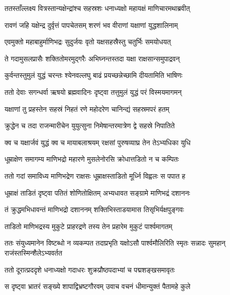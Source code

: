 
\twolineshloka
{ततस्ताँल्लक्ष्य वित्रस्तान्यक्षेन्द्रांश्च सहस्रशः}
{धनाध्यक्षो महायक्षं माणिचारमथाब्रवीत्} %

\twolineshloka
{रावणं जहि यक्षेन्द्र दुर्वृत्तं पापचेतसम्}
{शरणं भव वीराणां यक्षाणां युद्धशालिनाम्} %

\twolineshloka
{एवमुक्तो महाबाहुर्माणिभद्रः सुदुर्जयः}
{वृतो यक्षसहस्रैस्तु चतुर्भिः समयोधयत्} %

\twolineshloka
{ते गदामुसलप्रासैः शक्तितोमरमुद्गरैः}
{अभिघ्नन्तस्तदा यक्षा राक्षसान्समुपाद्रवन्} %

\twolineshloka
{कुर्वन्तस्तुमुलं युद्धं चरन्तः श्येनवल्लघु}
{बाढं प्रयच्छन्नेच्छामि दीयतामिति भाषिणः} %

\twolineshloka
{ततो देवाः सगन्धर्वा ऋषयो ब्रह्मवादिनः}
{दृष्ट्वा तत्तुमुलं युद्धं परं विस्मयमागमन्} %

\twolineshloka
{यक्षाणां तु प्रहस्तेन सहस्रं निहतं रणे}
{महोदरेण चानिन्द्यं सहस्रमपरं हतम्} %

\twolineshloka
{क्रुद्धेन च तदा राजन्मारीचेन युयुत्सुना}
{निमेषान्तरमात्रेण द्वे सहस्रे निपातिते} %

\twolineshloka
{क्व च यक्षार्जवं युद्धं क्व च मायाबलाश्रयम्}
{रक्षसां पुरुषव्याघ्र तेन तेऽभ्यधिका युधि} %

\twolineshloka
{धूम्राक्षेण समागम्य माणिभद्रो महारणे}
{मुसलेनोरसि क्रोधात्तडितो न च कम्पितः} %

\twolineshloka
{ततो गदां समाविध्य माणिभद्रेण राक्षसः}
{धूम्राक्षस्ताडितो मूर्ध्नि विह्वलः स पपात ह} %

\twolineshloka
{धूम्राक्षं ताडितं दृष्ट्वा पतितं शोणितोक्षितम्}
{अभ्यधावत सङ्ग्रामे माणिभद्रं दशाननः} %

\twolineshloka
{तं क्रुद्धमभिधावन्तं माणिभद्रो दशाननम्}
{शक्तिभिस्ताडयामास तिसृभिर्यक्षपुङ्गवः} %

\twolineshloka
{ताडितो माणिभद्रस्य मुकुटे प्राहरद्रणे}
{तस्य तेन प्रहारेम मुकुटं पार्श्वमागतम्} %

\threelineshloka
{ततः संयुध्यमानेन विष्टब्धो न व्यकम्पत}
{तदाप्रभृति यक्षोऽसौ पार्श्वमौलिरिति स्मृतः}
{सन्नादः सुमहान् राजंस्तस्मिन्शैलेऽभ्यवर्तत} %

\twolineshloka
{ततो दूरात्प्रददृशे धनाध्यक्षो गदाधरः}
{शुक्रप्रौष्ठपदाभ्यां च पद्मशङ्खसमावृतः} %

\twolineshloka
{स दृष्ट्वा भ्रातरं सङ्ख्ये शापाद्विभ्रष्टगौरवम्}
{उवाच वचनं धीमान्युक्तं पैतामहे कुले} %

